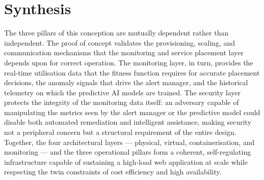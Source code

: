 \documentclass[a4paper, 12pt]{report}
\begin{document}
\section{Synthesis}
 
The three pillars of this conception are mutually dependent rather than
independent.  The proof of concept validates the provisioning, scaling,
and communication mechanisms that the monitoring and service placement
layer depends upon for correct operation.  The monitoring layer, in turn,
provides the real-time utilisation data that the fitness function requires
for accurate placement decisions, the anomaly signals that drive the
alert manager, and the historical telemetry on which the predictive AI
models are trained.  The security layer protects the integrity of the
monitoring data itself: an adversary capable of manipulating the metrics
seen by the alert manager or the predictive model could disable both
automated remediation and intelligent assistance, making security not a
peripheral concern but a structural requirement of the entire design.
Together, the four architectural layers --- physical, virtual,
containerisation, and monitoring --- and the three operational pillars
form a coherent, self-regulating infrastructure capable of sustaining a
high-load web application at scale while respecting the twin constraints
of cost efficiency and high availability.
 
\end{document}
